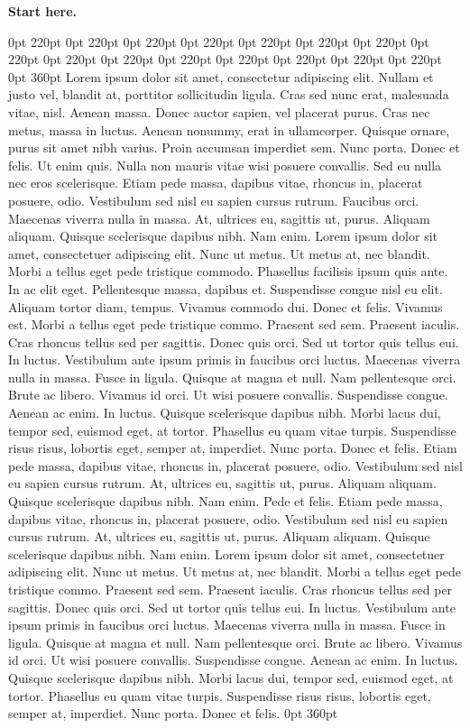 \documentclass[a4paper,11pt]{article}
\begin{document}
\vspace*{3cm}
\noindent\textbf{Start here.}\par
{} 0pt 220pt 0pt 220pt 0pt 220pt 0pt 220pt 0pt 220pt 0pt 220pt 0pt 220pt 0pt 220pt 0pt 220pt 0pt 220pt 0pt 220pt 0pt 220pt 0pt 220pt 0pt 220pt 0pt 220pt 0pt 360pt
Lorem ipsum dolor sit amet, consectetur adipiscing elit. Nullam et justo vel, blandit at, porttitor sollicitudin ligula. Cras sed nunc erat, malesuada vitae, nisl. Aenean massa. Donec auctor sapien, vel placerat purus. Cras nec metus, massa in luctus. Aenean nonummy, erat in ullamcorper. Quisque ornare, purus sit amet nibh varius. Proin accumsan imperdiet sem. Nunc porta. Donec et felis. Ut enim quis. Nulla non mauris vitae wisi posuere convallis. Sed eu nulla nec eros scelerisque. Etiam pede massa, dapibus vitae, rhoncus in, placerat posuere, odio. Vestibulum sed nisl eu sapien cursus rutrum. Faucibus orci. Maecenas viverra nulla in massa. At, ultrices eu, sagittis ut, purus. Aliquam aliquam. Quisque scelerisque dapibus nibh. Nam enim. Lorem ipsum dolor sit amet, consectetuer adipiscing elit. Nunc ut metus. Ut metus at, nec blandit. Morbi a tellus eget pede tristique commodo. Phasellus facilisis ipsum quis ante. In ac elit eget. Pellentesque massa, dapibus et. Suspendisse congue nisl eu elit. Aliquam tortor diam, tempus. Vivamus commodo dui. Donec et felis. Vivamus est. Morbi a tellus eget pede tristique commo. Praesent sed sem. Praesent iaculis. Cras rhoncus tellus sed per sagittis. Donec quis orci. Sed ut tortor quis tellus eui. In luctus. Vestibulum ante ipsum primis in faucibus orci luctus. Maecenas viverra nulla in massa. Fusce in ligula. Quisque at magna et null. Nam pellentesque orci. Brute ac libero. Vivamus id orci. Ut wisi posuere convallis. Suspendisse congue. Aenean ac enim. In luctus. Quisque scelerisque dapibus nibh. Morbi lacus dui, tempor sed, euismod eget, at tortor. Phasellus eu quam vitae turpis. Suspendisse risus risus, lobortis eget, semper at, imperdiet. Nunc porta. Donec et felis. Etiam pede massa, dapibus vitae, rhoncus in, placerat posuere, odio. Vestibulum sed nisl eu sapien cursus rutrum. At, ultrices eu, sagittis ut, purus. Aliquam aliquam. Quisque scelerisque dapibus nibh. Nam enim. Pede et felis. Etiam pede massa, dapibus vitae, rhoncus in, placerat posuere, odio. Vestibulum sed nisl eu sapien cursus rutrum. At, ultrices eu, sagittis ut, purus. Aliquam aliquam. Quisque scelerisque dapibus nibh. Nam enim. Lorem ipsum dolor sit amet, consectetuer adipiscing elit. Nunc ut metus. Ut metus at, nec blandit. Morbi a tellus eget pede tristique commo. Praesent sed sem. Praesent iaculis. Cras rhoncus tellus sed per sagittis. Donec quis orci. Sed ut tortor quis tellus eui. In luctus. Vestibulum ante ipsum primis in faucibus orci luctus. Maecenas viverra nulla in massa. Fusce in ligula. Quisque at magna et null. Nam pellentesque orci. Brute ac libero. Vivamus id orci. Ut wisi posuere convallis. Suspendisse congue. Aenean ac enim. In luctus. Quisque scelerisque dapibus nibh. Morbi lacus dui, tempor sed, euismod eget, at tortor. Phasellus eu quam vitae turpis. Suspendisse risus risus, lobortis eget, semper at, imperdiet. Nunc porta. Donec et felis.
 0pt 360pt
\end{document}
